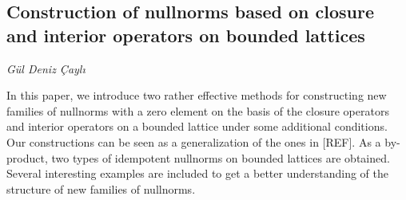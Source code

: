 \documentclass[../booklet.tex]{subfiles}
\begin{document}
\subsection[Construction of nullnorms based on closure and interior operators on bounded lattices. {\it Gül Deniz Çaylı}]{Construction of nullnorms based on closure and interior operators on bounded lattices}

\begin{center}
  {\it Gül Deniz Çaylı}
\end{center}



In this paper, we introduce two rather effective methods for constructing new families of nullnorms
with a zero element on the basis of the closure operators and interior operators on a
bounded lattice under some additional conditions. Our constructions can be seen as a
generalization of the ones in [REF]. As a by-product, two types of idempotent nullnorms
on bounded lattices are obtained. Several interesting examples are included to get a better
understanding of the structure of new families of nullnorms.

\end{document}

